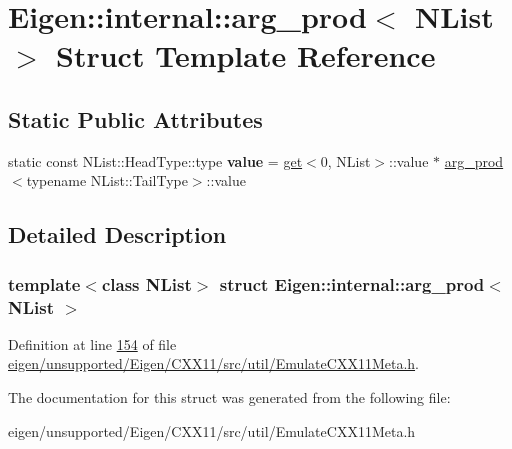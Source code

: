 \hypertarget{struct_eigen_1_1internal_1_1arg__prod}{}\section{Eigen\+:\+:internal\+:\+:arg\+\_\+prod$<$ N\+List $>$ Struct Template Reference}
\label{struct_eigen_1_1internal_1_1arg__prod}
\subsection*{Static Public Attributes}
\begin{DoxyCompactItemize}
\item 
\mbox{\label{struct_eigen_1_1internal_1_1arg__prod_acdab336f407cada0c58ae3d095443cfa}} 
static const N\+List\+::\+Head\+Type\+::type {\bfseries value} = \hyperlink{struct_eigen_1_1internal_1_1get}{get}$<$0, N\+List$>$\+::value $\ast$ \hyperlink{struct_eigen_1_1internal_1_1arg__prod}{arg\+\_\+prod}$<$typename N\+List\+::\+Tail\+Type$>$\+::value
\end{DoxyCompactItemize}


\subsection{Detailed Description}
\subsubsection*{template$<$class N\+List$>$\newline
struct Eigen\+::internal\+::arg\+\_\+prod$<$ N\+List $>$}



Definition at line \hyperlink{eigen_2unsupported_2_eigen_2_c_x_x11_2src_2util_2_emulate_c_x_x11_meta_8h_source_l00154}{154} of file \hyperlink{eigen_2unsupported_2_eigen_2_c_x_x11_2src_2util_2_emulate_c_x_x11_meta_8h_source}{eigen/unsupported/\+Eigen/\+C\+X\+X11/src/util/\+Emulate\+C\+X\+X11\+Meta.\+h}.



The documentation for this struct was generated from the following file\+:\begin{DoxyCompactItemize}
\item 
eigen/unsupported/\+Eigen/\+C\+X\+X11/src/util/\+Emulate\+C\+X\+X11\+Meta.\+h\end{DoxyCompactItemize}
